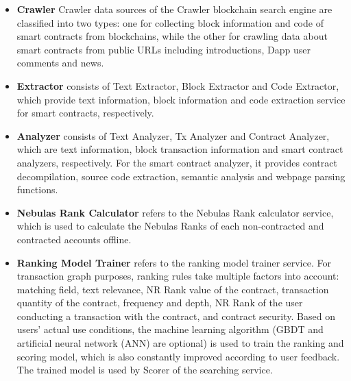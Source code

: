 \begin{itemize}
	\item \textbf{Crawler}  Crawler data sources of the Crawler blockchain search engine are classified into two types: one for collecting block information and code of smart contracts from blockchains, while the other for crawling data about smart contracts from public URLs including introductions, Dapp user comments and news.
	\item \textbf{Extractor} consists of Text Extractor, Block Extractor and Code Extractor, which provide text information, block information and code extraction service for smart contracts, respectively.
	\item \textbf{Analyzer} consists of Text Analyzer, Tx Analyzer and Contract Analyzer, which are text information, block transaction information and smart contract analyzers, respectively. For the smart contract analyzer, it provides contract decompilation, source code extraction, semantic analysis and webpage parsing functions.
	\item \textbf{Nebulas Rank Calculator} refers to the Nebulas Rank calculator service, which is used to calculate the Nebulas Ranks of each non-contracted and contracted accounts offline.
	\item \textbf{Ranking Model Trainer} refers to the ranking model trainer service. For transaction graph purposes, ranking rules take multiple factors into account: matching field, text relevance, NR Rank value of the contract, transaction quantity of the contract, frequency and depth, NR Rank of the user conducting a transaction with the contract, and contract security. Based on users' actual use conditions, the machine learning algorithm (GBDT and artificial neural network (ANN) are optional) is used to train the ranking and scoring model, which is also constantly improved according to user feedback. The trained model is used by Scorer of the searching service.

\end{itemize}
